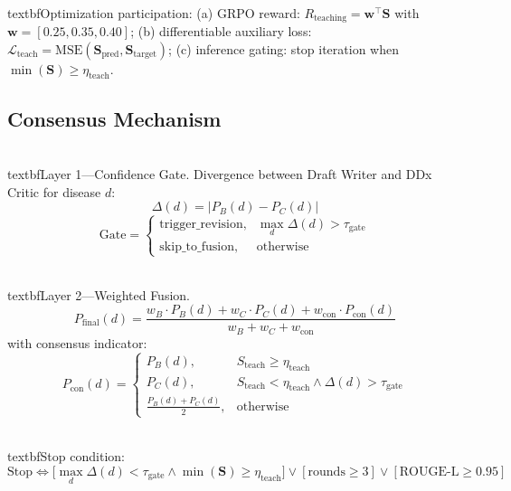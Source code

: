 \documentclass[runningheads,10pt]{llncs}
\newcommand{\Steach}{S_{\text{teach}}}
\newcommand{\Rteach}{R_{\text{teaching}}}
\newcommand{\Lteach}{\mathcal{L}_{\text{teach}}}
\begin{document}
\\textbf{Optimization participation:} (a) GRPO reward: $\Rteach = \mathbf{w}^\top \mathbf{S}$ with $\mathbf{w}=[0.25,0.35,0.40]$; (b) differentiable auxiliary loss: $\Lteach = \text{MSE}(\mathbf{S}_{\text{pred}}, \mathbf{S}_{\text{target}})$; (c) inference gating: stop iteration when $\min(\mathbf{S}) \geq \eta_{\text{teach}}$.

\subsection{Consensus Mechanism}

\\textbf{Layer 1---Confidence Gate.} Divergence between Draft Writer and DDx Critic for disease $d$:
\begin{equation}
\Delta(d) = |P_B(d) - P_C(d)| \label{eq:divergence}
\end{equation}
\begin{equation}
\text{Gate} = \begin{cases}
\text{trigger\_revision}, & \max_d \Delta(d) > \tau_{\text{gate}} \\
\text{skip\_to\_fusion}, & \text{otherwise}
\end{cases} \label{eq:gate}
\end{equation}

\\textbf{Layer 2---Weighted Fusion.}
\begin{equation}
P_{\text{final}}(d) = \frac{w_B \cdot P_B(d) + w_C \cdot P_C(d) + w_{\text{con}} \cdot P_{\text{con}}(d)}{w_B + w_C + w_{\text{con}}} \label{eq:fusion}
\end{equation}
with consensus indicator:
\begin{equation}
P_{\text{con}}(d) = \begin{cases}
P_B(d), & \Steach \geq \eta_{\text{teach}} \\
P_C(d), & \Steach < \eta_{\text{teach}} \land \Delta(d) > \tau_{\text{gate}} \\
\frac{P_B(d) + P_C(d)}{2}, & \text{otherwise}
\end{cases} \label{eq:conind}
\end{equation}

\\textbf{Stop condition:}
\begin{equation}
\text{Stop} \iff \bigl[ \max_d \Delta(d) < \tau_{\text{gate}} \land \min(\mathbf{S}) \geq \eta_{\text{teach}} \bigr] \lor [\text{rounds} \geq 3] \lor [\text{ROUGE-L} \geq 0.95] \label{eq:stop}
\end{equation}
\end{document}
